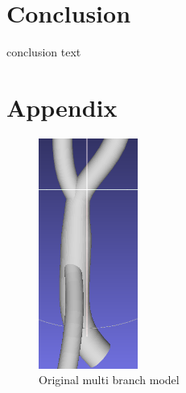 \documentclass[11p, titlepage]{article}
\begin{document}
\section{Conclusion}

conclusion text

\pagebreak



\section{Appendix}

\begin{figure}[h]
\centering
\includegraphics[width=0.29\textwidth]{mb}
\caption{Original multi branch model\label{fig:model}}
\end{figure}
\end{document}
